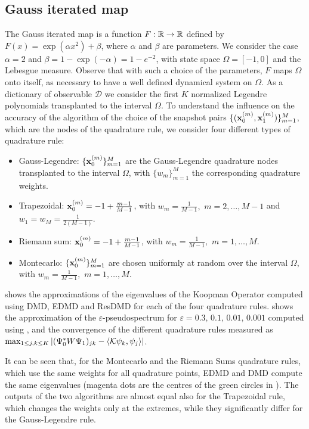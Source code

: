\subsection{Gauss iterated map}
\label{sect_gauss_iterated_map}
The Gauss iterated map is a function $F:\mathbb{R}\to\mathbb{R}$ defined by $F(x) =\exp(\alpha x^2) + \beta $, where $\alpha$ and $\beta$ are parameters. We consider the case $\alpha = 2$ and $\beta = 1-\exp(-\alpha) = 1 - e^{-2}$, with state space $\Omega = [-1, 0]$ and the Lebesgue measure. Observe that with such a choice of the parameters, $F$ maps $\Omega$ onto itself, as necessary to have a well defined dynamical system on $\Omega$. As a dictionary of observable $\mathcal{D}$ we consider the first $K$ normalized Legendre polynomials transplanted to the interval $\Omega$. To understand the influence on the accuracy of the algorithm of the choice of the snapshot pairs $\{(\vb{x}_0^{(m)}, \vb{x}_1^{(m)})\}_{m = 1}^M$, which are the nodes of the quadrature rule, we consider four different types of quadrature rule:
\begin{itemize}
    \item Gauss-Legendre: $\{\vb{x}_0^{(m)}\}_{m = 1}^M$ are the Gauss-Legendre quadrature nodes transplanted to the interval $\Omega$, with $\{w_m\}_{m = 1}^M$ the corresponding quadrature weights.
    \item Trapezoidal: $\vb{x}_0^{(m)} = -1 + \frac{m-1}{M-1}$, with $w_m = \frac{1}{M-1},\,\,m = 2,\dots, M-1$ and $w_1 = w_M = \frac{1}{2(M-1)}$.
    \item Riemann sum: $\vb{x}_0^{(m)} = -1 + \frac{m-1}{M-1}$, with $w_m = \frac{1}{M-1},\,\,m = 1,\dots, M$.
    \item Montecarlo: $\{\vb{x}_0^{(m)}\}_{m = 1}^M$ are chosen uniformly at random over the interval $\Omega$, with $w_m = \frac{1}{M-1},\,\,m = 1,\dots, M$. 
\end{itemize}

 shows the approximations of the eigenvalues of the Koopman Operator computed using DMD, EDMD and ResDMD for each of the four quadrature rules.  shows the approximation of the $\varepsilon$-pseudospectrum for $\varepsilon = 0.3,\,0.1,\,0.01,\,0.001$ computed using , and the convergence of the different quadrature rules measured as $\max_{1\leq j,k \leq K} \abs{(\Psi_0^* W \Psi_1)_{jk} - \langle\mathcal{K}\psi_k, \psi_j\rangle}$.

It can be seen that, for the Montecarlo and the Riemann Sums quadrature rules, which use the same weights for all quadrature points, EDMD and DMD compute the same eigenvalues (magenta dots are the centres of the green circles in ). The outputs of the two algorithms are almost equal also for the Trapezoidal rule, which changes the weights only at the extremes, while they significantly differ for the Gauss-Legendre rule.

